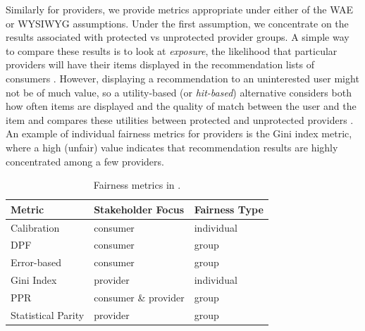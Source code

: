 Similarly for providers, we provide metrics appropriate under either of the WAE or WYSIWYG assumptions. Under the first assumption, we concentrate on the results associated with protected vs unprotected provider groups. A simple way to compare these results is to look at \textit{exposure}, the likelihood that particular providers will have their items displayed in the recommendation lists of consumers \cite{liu2019farpfar,sonboli2020opportunistic}. However, displaying a recommendation to an uninterested user might not be of much value, so a utility-based (or \textit{hit-based}) alternative considers both how often items are displayed and the quality of match between the user and the item and compares these utilities between protected and unprotected providers \cite{singh2018fairness,biega2018equity}. An example of individual fairness metrics for providers is the Gini index metric, where a high (unfair) value indicates that recommendation results are highly concentrated among a few providers.

\begin{table}[tb]
\centering
\caption{Fairness metrics in \libauto.}
\label{tab:fair_metrics}
\begin{threeparttable}
\begin{tabular}{lll}
\toprule
Metric            & Stakeholder Focus     & Fairness Type \\\midrule
Calibration        & consumer             & individual \\
DPF                & consumer             & group \\
Error-based        & consumer             & group \\
Gini Index         & provider             & individual \\
PPR                & consumer \& provider & group \\
Statistical Parity & provider             & group \\
\bottomrule
                                 
\end{tabular}
\end{threeparttable}
\end{table}

